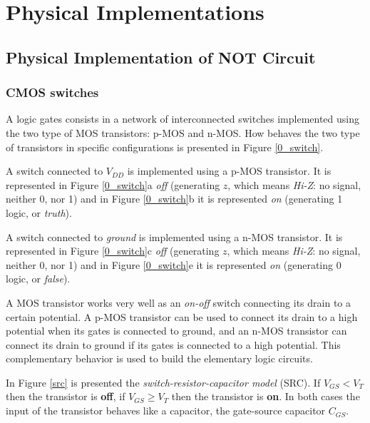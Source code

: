 \chapter{Physical Implementations} \label{app:physical_implementations}


\section{Physical Implementation of NOT Circuit}

\subsection{CMOS switches}

A logic gates consists in a network of interconnected switches
implemented using the two type of MOS transistors: p-MOS and
n-MOS. How behaves the two type of transistors in specific
configurations is presented in Figure \ref{0_switch}.

A switch connected to $V_{DD}$ is implemented using a p-MOS
transistor. It is represented in Figure \ref{0_switch}a {\em off}
(generating $z$, which means {\em Hi-Z}: no signal, neither 0, nor
1) and in Figure \ref{0_switch}b it is represented {\em on}
(generating 1 logic, or {\em truth}).

A switch connected to {\em ground} is implemented using a n-MOS
transistor. It is represented in Figure \ref{0_switch}c {\em off}
(generating $z$, which means {\em Hi-Z}: no signal, neither 0, nor
1) and in Figure \ref{0_switch}e it is represented {\em on}
(generating 0 logic, or {\em false}).


A MOS transistor works very well as an {\em on-off} switch
connecting its drain to a certain potential.  A p-MOS transistor
can be used to connect its drain to a high potential when its
gates is connected to ground, and an n-MOS transistor can connect
its drain to ground if its gates is connected to a high potential.
This complementary behavior is used to build the elementary logic
circuits.

In Figure \ref{src} is presented the {\em switch-resistor-capacitor
model} (SRC). If $V_{GS} < V_{T}$ then the transistor is {\bf off}, if
$V_{GS} \geq V_{T}$ then the transistor is {\bf on}. In both cases the
input of the transistor behaves like a capacitor, the gate-source
capacitor $C_{GS}$.

